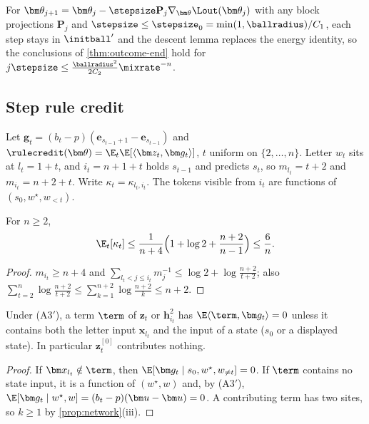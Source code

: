 \begin{remark}
\label{rem:flow}
For $\bm\theta_{j+1}=\bm\theta_j-\stepsize\mathbf P_j\nabla_{\bm\theta}\Lout(\bm\theta_j)$ with any block projections $\mathbf P_j$ and $\stepsize\le\stepsize_0=\min(1,\ballradius)/C_1$, each step stays in
$\initball'$ and the descent lemma replaces the energy identity, so the conclusions of \cref{thm:outcome-end} hold for $j\stepsize\le\frac{\ballradius^2}{2C_2}\mixrate^{-n}$.
\end{remark}

\subsection{Step rule credit}

Let $\bm g_t=(b_t-p)(\bm e_{s_{t-1}+1}-\bm e_{s_{t-1}})$ and $\rulecredit(\bm\theta)=\E_t\E[\langle\bm z_t,\bm g_t\rangle]$, $t$ uniform on $\{2,\ldots,n\}$. Letter $w_t$ sits at
$l_t=1+t$, and $i_t=n+1+t$ holds $s_{t-1}$ and predicts $s_t$, so $m_{l_t}=t+2$ and $m_{i_t}=n+2+t$. Write $\kappa_t=\kappa_{l_t,i_t}$. The tokens visible from $i_t$ are
functions of $(s_0,w^\star,w_{<t})$.

\begin{lemma}
\label{lem:dilution-average}
For $n\ge2$,
\begin{equation}
 \E_t[\kappa_t]\le\frac{1}{n+4}\Bigl(1+\log2+\frac{n+2}{n-1}\Bigr)\le\frac{6}{n} .
 \label{eq:dilution-avg}
\end{equation}
\end{lemma}

\begin{proof}
$m_{i_t}\ge n+4$ and $\sum_{l_t<j\le i_t}m_j^{-1}\le\log2+\log\frac{n+2}{t+2}$; also $\sum_{t=2}^n\log\frac{n+2}{t+2}\le\sum_{k=1}^{n+2}\log\frac{n+2}{k}\le n+2$.
\end{proof}

\begin{lemma}
\label{lem:rule-sites}
Under (A3$'$), a term $\term$ of $\bm z_t$ or $\bm h^2_{i_t}$ has $\E\langle\term,\bm g_t\rangle=0$ unless it contains both the letter input $\bm x_{l_t}$ and the input of a
state ($s_0$ or a displayed state). In particular $\bm z^{[0]}_t$ contributes nothing.
\end{lemma}

\begin{proof}
If $\bm x_{l_t}\notin\term$, then $\E[\bm g_t\mid s_0,w^\star,w_{\ne t}]=0$. If $\term$ contains no state input, it is a function of $(w^\star,w)$ and, by (A3$'$),
$\E[\bm g_t\mid w^\star,w]=(b_t-p)(\bm u-\bm u)=0$. A contributing term has two sites, so $k\ge1$ by \cref{prop:network}(iii).
\end{proof}

